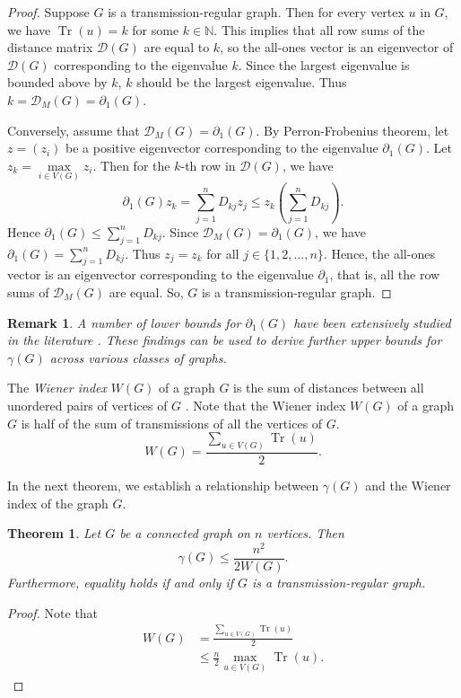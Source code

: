 \documentclass[12pt]{article}
\newtheorem{theorem}{Theorem}[section]
\newtheorem{remark}{Remark}[section]
\DeclareMathOperator{\tr}{Tr}
\begin{document}
{{\begin{proof}
				Suppose $G$ is a transmission-regular graph. Then for every vertex $u$ in $G$, we have $\tr(u)=k$ for some $k\in \mathbb{N}$. This implies that all row sums of the distance matrix $\mathcal{D}(G)$ are equal to $k$, so the all-ones vector is an eigenvector of $\mathcal{D}(G)$ corresponding to the eigenvalue $k$. Since the largest eigenvalue is bounded above by $k$, $k$ should be the largest eigenvalue. Thus $k=\mathcal{D}_M(G)= \partial_1 (G)$.
				
				Conversely, assume that $\mathcal{D}_M(G)= \partial_1 (G)$. By Perron-Frobenius theorem, let $z = (z_i)$ be a positive eigenvector corresponding to the eigenvalue $\partial_1 (G)$. Let $z_k=\max\limits_{i \in V(G)} z_i$. Then for the $k$-th row in $\mathcal{D}(G)$, we have
				$$
				\partial_1(G) z_k=\sum\limits_{j=1}^n D_{kj}z_j \leq z_k(\sum\limits_{j=1}^n D_{kj}).
				$$
				Hence $\partial_1(G) \leq \sum\limits_{j=1}^n D_{kj} $. Since $\mathcal{D}_M(G)= \partial_1 (G)$, we  have $\partial_1 (G) = \sum\limits_{j=1}^n D_{kj}$. Thus $z_j=z_k$ for all $j \in \{1,2, \dots,n\}$. Hence, the all-ones vector is an eigenvector corresponding to the eigenvalue $\partial_1$, that is, all the row sums of $\mathcal{D}_M(G)$ are equal. So, $G$ is a transmission-regular graph.
			\end{proof}
			\begin{remark}
				A number of lower bounds for $\partial_1(G)$ have been extensively studied in the literature \cite{Distance-spectra}.  These findings can be used to derive further upper bounds for $\gamma(G)$ across various classes of graphs.
			\end{remark}
			
			
			The \textit{Wiener index} $W(G)$ of a graph $G$ is the sum of distances between all unordered pairs of vertices of $G$ \cite{Distance-spectra}. Note that the Wiener index $W(G)$ of a graph $G$ is half of the sum of transmissions of all the vertices of $G$.
			$$
			W(G)=\frac{\sum\limits_{u \in V(G)}\tr(u)}{2}.
			$$
			
			In the next theorem, we establish a relationship between $\gamma (G)$ and the Wiener index of the graph $G$. 
			\begin{theorem}\label{weiner-index-bound}
				Let $G$ be a connected graph on $n$ vertices. Then
				$$
				\gamma(G) \leq \frac{n^2}{2W(G)}.
				$$
				Furthermore, equality holds if and only if  $G$ is a transmission-regular graph.
			\end{theorem}
			\begin{proof} 
				Note that
				\begin{align*}
					W(G)&=\frac{\sum\limits_{u \in V(G)}\tr(u)}{2} \\ 
					&\leq  \frac{n}{2} \max\limits_{u \in V(G)}\tr(u).
				\end{align*}
				

\end{proof}}}
\end{document}

